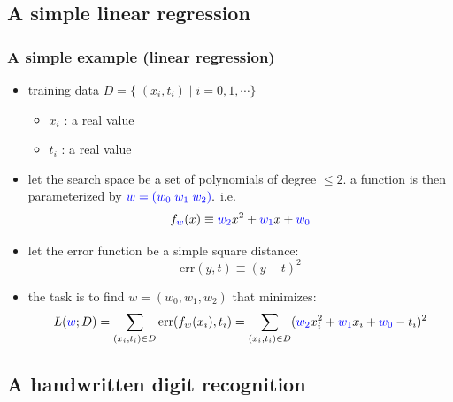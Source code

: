 \documentclass[12pt,dvipdfmx]{beamer}
\newcommand{\ao}[1]{{\color{blue}#1}}
\begin{document}
\subsection{A simple linear regression}

\begin{frame}
\frametitle{A simple example (linear regression)}
\begin{itemize}
\item<1-> training data $D = \{\; (x_i,t_i)\;|\; i = 0, 1, \cdots \}$
  \begin{itemize}
  \item $x_i$ : a real value
  \item $t_i$ : a real value
  \end{itemize}

\item<2-> let the search space be a set of polynomials of degree $\leq 2$.
  a function is then parameterized by $\ao{w = (w_0\;w_1\;w_2)}.$ i.e.
  \[ f_{\ao{w}}(x) \equiv \ao{w_2} x^2 + \ao{w_1} x + \ao{w_0} \]

\item<3-> let the error function be a simple square distance:
  \[ \mbox{err}(y, t) \equiv (y - t)^2 \]

\item<4-> the task is to find $w = (w_0, w_1, w_2)$ that minimizes:
  \[ L(\ao{w}; D) = \sum_{(x_i,t_i)\in D} 
  \mbox{err}(f_w(x_i),t_i) 
= \sum_{(x_i,t_i)\in D} (\ao{w_2} x_i^2 + \ao{w_1} x_i + \ao{w_0} - t_i)^2 \]
\end{itemize}
\end{frame}

\subsection{A handwritten digit recognition}
\end{document}
